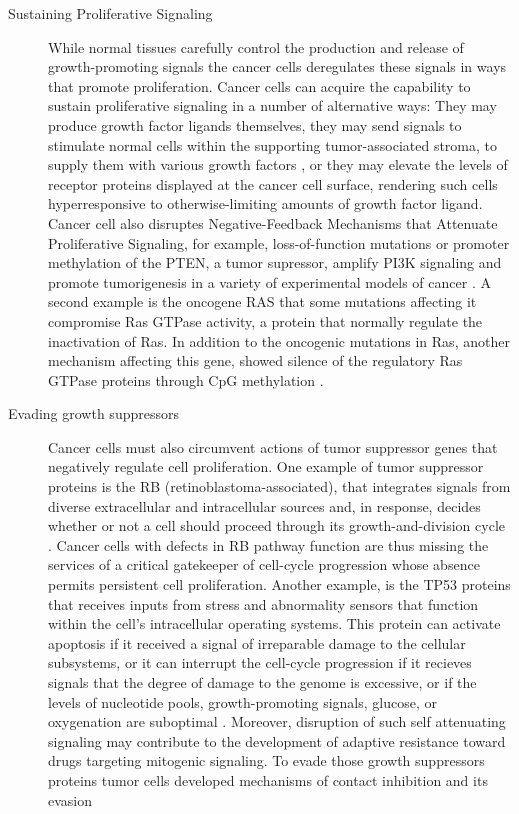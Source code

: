 \begin{description}
  \item [Sustaining Proliferative Signaling]
  While normal tissues carefully control the production and release of growth-promoting
  signals the cancer cells deregulates these signals in ways that promote proliferation.
    Cancer cells can acquire the capability to sustain proliferative signaling in a number of alternative ways: They may produce growth factor ligands themselves, they may send signals to stimulate normal cells within the supporting tumor-associated stroma, to supply them with various growth factors \cite{cheng2008transforming}, or
   they may elevate the levels of receptor proteins displayed at the cancer cell surface,
   rendering such cells hyperresponsive to otherwise-limiting amounts of growth factor ligand.
   Cancer cell also disruptes Negative-Feedback Mechanisms that Attenuate Proliferative Signaling,
   for example,  loss-of-function mutations or promoter methylation of the PTEN, a tumor supressor, amplify PI3K signaling and promote tumorigenesis in a variety of experimental models of cancer \cite{jiang2009pi3k}. A second example is the oncogene RAS that some mutations affecting it compromise Ras GTPase activity,  a protein that normally regulate the inactivation of Ras. In addition to the oncogenic mutations in Ras, another mechanism affecting this gene,  showed silence of the regulatory Ras GTPase proteins through CpG methylation \cite{jin2007epigenetic}.
   \item [Evading growth suppressors]  Cancer cells must also circumvent actions of tumor suppressor genes that negatively regulate cell proliferation. One example of tumor suppressor proteins is the  RB (retinoblastoma-associated),
   that integrates signals from diverse extracellular and intracellular sources and, in response, decides whether or not a cell should proceed through its growth-and-division cycle \cite{burkhart2008cellular}.
   Cancer cells with defects in RB pathway function are thus missing the services of a critical gatekeeper of cell-cycle progression whose absence permits persistent cell proliferation. Another example, is the TP53 proteins that
    receives inputs from stress and abnormality sensors that function within the cell's intracellular operating systems.
    This protein can activate apoptosis if it received a signal of irreparable damage to the cellular subsystems, or it can
    interrupt the cell-cycle progression if it recieves signals that the degree of damage to the genome is excessive, or if the levels of nucleotide pools, growth-promoting signals, glucose, or oxygenation are suboptimal \cite{hanahan2011hallmarks}.
    Moreover, disruption of such self attenuating
    signaling may contribute to the development of
    adaptive resistance toward drugs targeting mitogenic signaling.
    To evade those growth suppressors proteins tumor cells developed mechanisms of contact inhibition and its evasion


\end{description}
